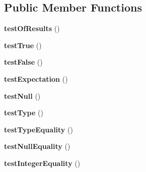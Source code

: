 \subsection*{Public Member Functions}
\begin{DoxyCompactItemize}
\item 
\hypertarget{class_passing_unit_test_case_output_ab4250971d963cbb13a2ee46eaaae952f}{
{\bfseries testOfResults} ()}
\label{class_passing_unit_test_case_output_ab4250971d963cbb13a2ee46eaaae952f}

\item 
\hypertarget{class_passing_unit_test_case_output_a16547f3b5dc249a1e89758529fa64736}{
{\bfseries testTrue} ()}
\label{class_passing_unit_test_case_output_a16547f3b5dc249a1e89758529fa64736}

\item 
\hypertarget{class_passing_unit_test_case_output_a2773b4e72b3047c330bddf3e5a2557c6}{
{\bfseries testFalse} ()}
\label{class_passing_unit_test_case_output_a2773b4e72b3047c330bddf3e5a2557c6}

\item 
\hypertarget{class_passing_unit_test_case_output_a8bb65390e9c07047283d04f3e814844f}{
{\bfseries testExpectation} ()}
\label{class_passing_unit_test_case_output_a8bb65390e9c07047283d04f3e814844f}

\item 
\hypertarget{class_passing_unit_test_case_output_a78dd58120a0a15d3733f78cecd992562}{
{\bfseries testNull} ()}
\label{class_passing_unit_test_case_output_a78dd58120a0a15d3733f78cecd992562}

\item 
\hypertarget{class_passing_unit_test_case_output_a4652ea072fc0ebac0105fa81849a31a4}{
{\bfseries testType} ()}
\label{class_passing_unit_test_case_output_a4652ea072fc0ebac0105fa81849a31a4}

\item 
\hypertarget{class_passing_unit_test_case_output_ad63cc80b0e0894095f6449a9013d2d05}{
{\bfseries testTypeEquality} ()}
\label{class_passing_unit_test_case_output_ad63cc80b0e0894095f6449a9013d2d05}

\item 
\hypertarget{class_passing_unit_test_case_output_afdb0e012d0ecdeec8edc468da7163c7c}{
{\bfseries testNullEquality} ()}
\label{class_passing_unit_test_case_output_afdb0e012d0ecdeec8edc468da7163c7c}

\item 
\hypertarget{class_passing_unit_test_case_output_a77abfc28e242b7f5eaabd536182a5685}{
{\bfseries testIntegerEquality} ()}
\label{class_passing_unit_test_case_output_a77abfc28e242b7f5eaabd536182a5685}


\end{DoxyCompactItemize}
